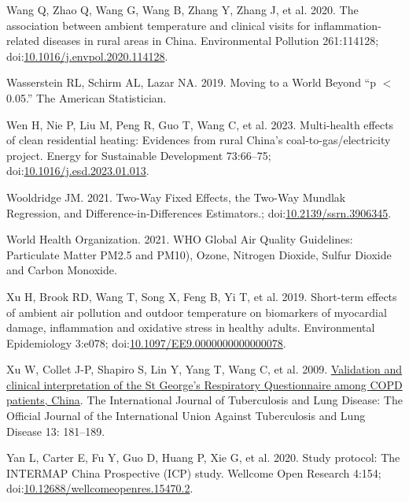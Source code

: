 \documentclass[
  letterpaper,
  DIV=11,
  numbers=noendperiod]{scrartcl}
\newlength{\cslhangindent}
\newenvironment{CSLReferences}[2] %
 {\begin{list}{}{%
  \setlength{\itemindent}{0pt}
  \setlength{\leftmargin}{0pt}
  \setlength{\parsep}{0pt}
  \ifodd #1
   \setlength{\leftmargin}{\cslhangindent}
   \setlength{\itemindent}{-1\cslhangindent}
  \fi
  \setlength{\itemsep}{#2\baselineskip}}}
 {\end{list}}
\begin{document}
\begin{CSLReferences}{1}{1}
Wang Q, Zhao Q, Wang G, Wang B, Zhang Y, Zhang J, et al. 2020. The
association between ambient temperature and clinical visits for
inflammation-related diseases in rural areas in {China}. Environmental
Pollution 261:114128;
doi:\href{https://doi.org/10.1016/j.envpol.2020.114128}{10.1016/j.envpol.2020.114128}.

Wasserstein RL, Schirm AL, Lazar NA. 2019. Moving to a {World Beyond}
{``p {\(<\)} 0.05.''} The American Statistician.

Wen H, Nie P, Liu M, Peng R, Guo T, Wang C, et al. 2023. Multi-health
effects of clean residential heating: {Evidences} from rural {China}'s
coal-to-gas/electricity project. Energy for Sustainable Development
73:66--75;
doi:\href{https://doi.org/10.1016/j.esd.2023.01.013}{10.1016/j.esd.2023.01.013}.

Wooldridge JM. 2021. Two-{Way Fixed Effects}, the {Two-Way Mundlak
Regression}, and {Difference-in-Differences Estimators}.;
doi:\href{https://doi.org/10.2139/ssrn.3906345}{10.2139/ssrn.3906345}.

World Health Organization. 2021. {WHO Global Air Quality Guidelines}:
{Particulate Matter PM2}.5 and {PM10}), {Ozone}, {Nitrogen Dioxide},
{Sulfur Dioxide} and {Carbon Monoxide}.

Xu H, Brook RD, Wang T, Song X, Feng B, Yi T, et al. 2019. Short-term
effects of ambient air pollution and outdoor temperature on biomarkers
of myocardial damage, inflammation and oxidative stress in healthy
adults. Environmental Epidemiology 3:e078;
doi:\href{https://doi.org/10.1097/EE9.0000000000000078}{10.1097/EE9.0000000000000078}.

Xu W, Collet J-P, Shapiro S, Lin Y, Yang T, Wang C, et al. 2009.
\href{https://www.ncbi.nlm.nih.gov/pubmed/19146745}{Validation and
clinical interpretation of the {St George}'s {Respiratory Questionnaire}
among {COPD} patients, {China}}. The International Journal of
Tuberculosis and Lung Disease: The Official Journal of the International
Union Against Tuberculosis and Lung Disease 13: 181--189.

Yan L, Carter E, Fu Y, Guo D, Huang P, Xie G, et al. 2020. Study
protocol: {The INTERMAP China Prospective} ({ICP}) study. Wellcome Open
Research 4:154;
doi:\href{https://doi.org/10.12688/wellcomeopenres.15470.2}{10.12688/wellcomeopenres.15470.2}.


\end{CSLReferences}
\end{document}

